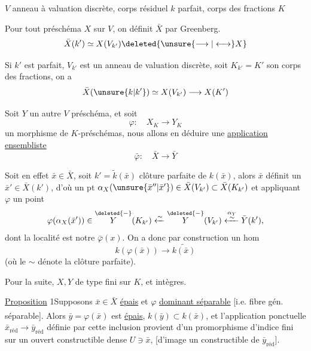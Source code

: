 $V$ anneau à valuation discrète, corps résiduel $k$ parfait, corps des fractions $K$

Pour tout préschéma $X$ sur $V$, on définit $\bar X$ par Greenberg.
\[
\bar X(k')\simeq X(V_{k'})\deleted{\unsure{\longrightarrow|\longleftrightarrow}X}
\]

Si $k'$ est parfait, $V_{k'}$ est un anneau de valuation discrète, soit $K_{k'}=K'$ son corps des fractions, on a
\[
\bar X(\unsure{k|k'})\simeq X(V_{k'})\longrightarrow X(K')
\]

Soit  $Y$ un autre $V$ préschéma,  et soit
\[
\varphi:\quad X_K\longrightarrow Y_K
\]
un morphisme de $K$-préschémas, nous allons en déduire une \uline{application ensembliste}
\[
\bar\varphi:\quad\bar X\longrightarrow\bar Y
\]

Soit en effet $\bar x\in\bar X$, soit $k'=\tilde{k}(\bar x)$  clôture parfaite de $k(\bar x)$, alors $\bar x$ définit un  $\bar x'\in\bar X(k')$, d'où un pt  $\alpha_X(\unsure{\bar x''|\bar x'})\in\bar X(V_{k'})\subset\bar X(K_{k'})$ et appliquant $\varphi$ un point
\[
\varphi(\alpha_X(\bar x'))\in\overset{\deleted{\mathord{-}}}{Y}(K_{k'})
\xleftarrow{\sim}\overset{\deleted{\mathord{-}}}{Y}(V_{k'})
\xleftarrow{\substack{\alpha_Y\\\sim}}\bar Y(k'),
\]
dont la localité est notre $\bar\varphi(x)$. On a donc par construction un hom
\[
k(\varphi(\bar x))\longrightarrow\widetilde{k(\bar x)}
\]
(où le $\sim$ dénote la clôture parfaite).

Pour la suite, $X,Y$ de type fini sur $K$, et  intègres.

\uline{Proposition} 1\quad Supposons $\bar x\in\bar X$ \uline{épais} et $\varphi$ \uline{dominant  séparable} [i.e. fibre gén. séparable]. Alors\textsuperscript{} $\bar y=\varphi(\bar x)$  est \uline{épais}, $k(\bar y)\subset{}k(\bar x)$, et l'application ponctuelle $\bar x_{\mathrm{réd}}\longrightarrow\bar y_{\mathrm{réd}}$ définie par cette inclusion provient d'un promorphisme d'indice fini sur un ouvert constructible dense $U\ni\bar x$, [d'image un  constructible de $\bar y_{\mathrm{réd}}$].
